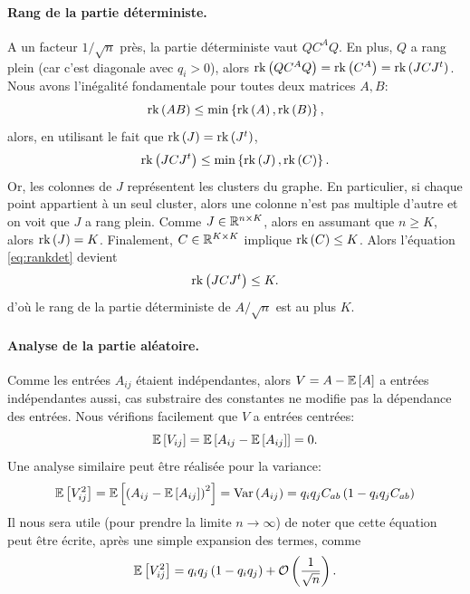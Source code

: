 \documentclass[../../main.tex]{subfiles} %
\begin{document}
\paragraph{Rang de la partie déterministe.} A un facteur $1/ \sqrt n$ près, la 
partie déterministe vaut $Q C^A Q$. En plus, $Q$ a rang plein (car c'est 
diagonale avec $q_i > 0$), alors $\operatorname{rk} \left( Q C^A Q \right) = \operatorname{rk} \left( C^A \right) = \operatorname{rk} \left( J C J^t \right)$.
Nous avons l'inégalité fondamentale pour toutes deux matrices $A, B$:
\begin{equation*}
	\operatorname{rk} \left( AB \right) \leq \min \left\{ \operatorname{rk} \left( A \right), \operatorname{rk} \left( B \right) \right\},
\end{equation*}
alors, en utilisant le fait que $\operatorname{rk} \left( J \right) = \operatorname{rk} \left( J^t \right)$,
\begin{equation}
	\operatorname{rk} \left( J C J^t \right) \leq \min\left\{\operatorname{rk} \left( J \right), \operatorname{rk} \left( C \right)\right\}.
\label{eq:rankdet}
\end{equation}
Or, les colonnes de $J$ représentent les clusters du graphe. En particulier, si
chaque point appartient à un seul cluster, alors une colonne n'est pas multiple
d'autre et on voit que $J$ a rang plein. Comme $J \in \mathbb R^{n \times K}$, alors en
assumant que $n \geq K$, alors $\operatorname{rk} \left( J \right) = K$. Finalement, $C \in \mathbb R^{K \times K}$
implique $\operatorname{rk} \left( C \right) \leq K$. Alors l'équation \ref{eq:rankdet} devient
\[
\operatorname{rk} \left( J C J^t \right) \leq K.
\]
d'où le rang de la partie déterministe de $A / \sqrt n$ est au plus $K$.

\paragraph{Analyse de la partie aléatoire.} Comme les entrées $A_{ij}$ étaient 
indépendantes, alors $V = A - \mathbb E \left[ A \right]$ a entrées indépendantes aussi, cas 
substraire des constantes ne modifie pas la dépendance des entrées. Nous 
vérifions facilement que $V$ a entrées centrées:
\begin{equation*}
	\mathbb E \left[ V_{ij} \right] = \mathbb E \left[ A_{ij} - \mathbb E \left[ A_{ij} \right] \right] = 0.
\end{equation*}
Une analyse similaire peut être réalisée pour la variance:
\begin{equation}
	\mathbb E \left[ V_{ij}^2 \right] = \mathbb E \left[  \left( A_{ij} - \mathbb E \left[ A_{ij} \right]\right)^2 \right] 
	= \operatorname{Var} \left( A_{ij} \right) = q_i q_j C_{ab} \left( 1 - q_i q_j C_{ab} \right)
	\label{eq:variance}
\end{equation}
Il nous sera utile (pour prendre la limite $n \to \infty$) de noter que cette 
équation peut être écrite, après une simple expansion des termes, comme
\begin{equation*}
	\mathbb E \left[ V_{ij}^2 \right] = q_i q_j \left( 1 - q_i q_j \right) + \mathcal{O} 
	\left( \frac{1}{\sqrt n} \right).
\end{equation*}
\end{document}
